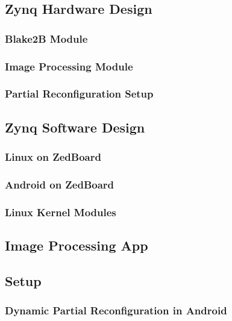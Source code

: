 \subsection{Zynq Hardware Design}\label{ssec:zynqhardwaredesign}

\subsubsection{Blake2B Module}\label{sssec:blake2bmodule}

\subsubsection{Image Processing Module}\label{sssec:imageprocessingmodule}

\subsubsection{Partial Reconfiguration Setup}\label{sssec:partialreconfigurationsetup}

\subsection{Zynq Software Design}\label{ssec:zynqsoftwaredesign}

\subsubsection{Linux on ZedBoard}\label{sssec:linuxonzedboard}

\subsubsection{Android on ZedBoard}\label{sssec:androidonzedboard}

\subsubsection{Linux Kernel Modules}\label{sssec:linuxkernelmodules}

\subsection{Image Processing App}\label{sssec:imageprocessingapp}

\subsection{Setup}\label{ssec:setup}

\subsubsection{Dynamic Partial Reconfiguration in Android}\label{sssec:dynamicpartialreconfiguration}

